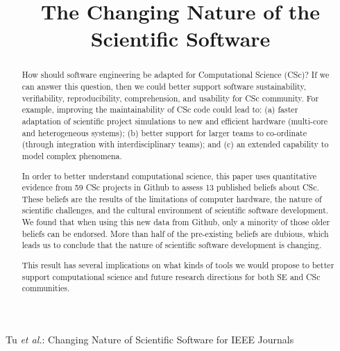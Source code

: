 \documentclass[conference,10pt]{IEEEtran}
\begin{document}
\title{The Changing Nature of the Scientific Software \vspace{-5pt}}
\author{ \vspace{-15pt}}





%
{Tu \MakeLowercase{\textit{et al.}}: Changing Nature of Scientific Software for IEEE Journals}

\maketitle
\thispagestyle{plain}
\pagestyle{plain}
\IEEEpeerreviewmaketitle

\begin{abstract}

How should software engineering be adapted for Computational Science (CSc)? If we can answer this question, then we could better support software sustainability, verifiability, reproducibility, comprehension, and usability for CSc community. For example, improving the maintainability of CSc code could lead to: (a) faster adaptation of scientific project simulations to new and efficient hardware (multi-core and heterogeneous systems); (b) better support  for larger teams to co-ordinate (through integration with interdisciplinary teams); and (c) an extended capability to  model complex phenomena. 

In order to better understand computational science, this paper uses quantitative evidence from 59 CSc projects in Github to assess 13 published beliefs about CSc. These beliefs are the results of the limitations of computer hardware, the nature of scientific challenges, and the cultural environment of scientific software development. We found that when using this new data from Github, only a minority of those older beliefs can be endorsed. More than half of the pre-existing beliefs are dubious, which leads us to conclude that the nature of scientific software development is changing. 

This result has several implications on what kinds of tools we would propose to better support computational science and future research directions for both SE and CSc communities.

\end{abstract}
\end{document}
